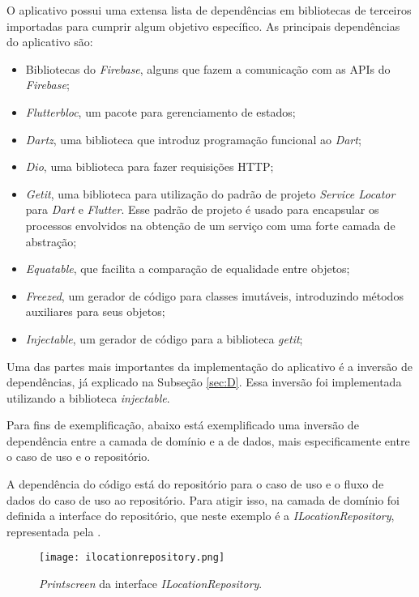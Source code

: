 O aplicativo possui uma extensa lista de dependências em bibliotecas de terceiros importadas para cumprir algum objetivo específico. As principais dependências do aplicativo são:

\begin{itemize}
  \item Bibliotecas do \textit{Firebase}, alguns  que fazem a comunicação com as APIs do \textit{Firebase};
  \item \textit{Flutter\underline{\space}bloc}, um pacote para gerenciamento de estados;
  \item \textit{Dartz}, uma biblioteca que introduz programação funcional ao \textit{Dart};
  \item \textit{Dio}, uma biblioteca para fazer requisições HTTP;
  \item \textit{Get\underline{\space}it}, uma biblioteca para utilização do padrão de projeto \textit{Service Locator} para \textit{Dart} e \textit{Flutter}. Esse padrão de projeto é usado para encapsular os processos envolvidos na obtenção de um serviço com uma forte camada de abstração;
  \item \textit{Equatable}, que facilita a comparação de equalidade entre objetos;
  \item \textit{Freezed}, um gerador de código para classes imutáveis, introduzindo métodos auxiliares para seus objetos;
  \item \textit{Injectable}, um gerador de código para a biblioteca \textit{get\underline{\space}it};
\end{itemize}

Uma das partes mais importantes da implementação do aplicativo é a inversão de dependências, já explicado na Subseção \ref{sec:D}. Essa inversão foi implementada utilizando a biblioteca \textit{injectable}.

Para fins de exemplificação, abaixo está exemplificado uma inversão de dependência entre a camada de domínio e a de dados, mais especificamente entre o caso de uso e o repositório.

A dependência do código está do repositório para o caso de uso e o fluxo de dados do caso de uso ao repositório. Para atigir isso, na camada de domínio foi definida a interface do repositório, que neste exemplo é a \textit{ILocationRepository}, representada pela .

\begin{figure}[!htb]
  \centering
  \texttt{[image: ilocationrepository.png]}
  \caption{\textit{Printscreen} da interface \textit{ILocationRepository}.}
  \label{fig:locationrepository}
\end{figure}

